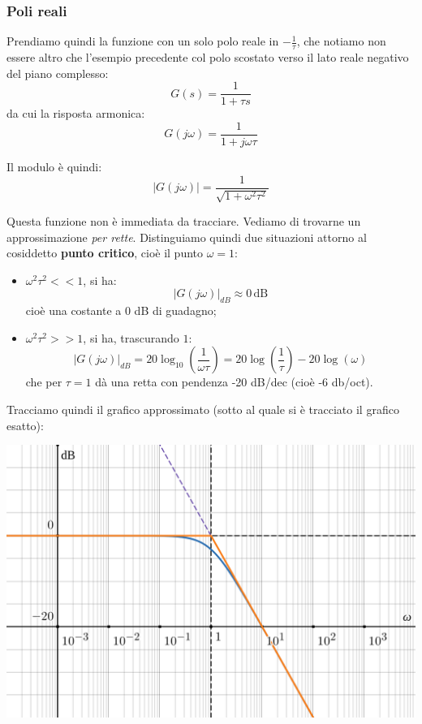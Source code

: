 \documentclass[a4paper,11pt]{article}
\begin{document}
\par\medskip

\subsubsection{Poli reali}
Prendiamo quindi la funzione con un solo polo reale in $-\frac{1}{\tau}$, che notiamo non essere altro che l'esempio precedente col polo scostato verso il lato reale negativo del piano complesso:
$$
G(s) = \frac{1}{1 + \tau s} 
$$
da cui la risposta armonica:
$$
G(j \omega) = \frac{1}{1 + j \omega \tau}
$$

Il modulo è quindi:
$$
|G(j \omega)| = \frac{1}{\sqrt{1 + \omega^2 \tau^2}}
$$

Questa funzione non è immediata da tracciare.
Vediamo di trovarne un approssimazione \textit{per rette}.
Distinguiamo quindi due situazioni attorno al cosiddetto \textbf{punto critico}, cioè il punto $\omega = 1$:
\begin{itemize}
	\item $\omega^2 \tau^2 << 1$, si ha:
		$$
		|G(j\omega)|_{dB} \approx 0 \, \mathrm{dB}
		$$
		cioè una costante a 0 dB di guadagno;
	\item $\omega^2 \tau^2 >> 1$, si ha, trascurando $1$:
		$$
		|G(j \omega)|_{dB} = 20 \log_{10} \left( \frac{1}{\omega \tau} \right) =
		20 \log \left( \frac{1}{\tau} \right) - 20 \log \left( \omega \right)
		$$
		che per $\tau = 1$ dà una retta con pendenza -20 dB/dec (cioè -6 db/oct).
\end{itemize}

\par\medskip

\noindent
\begin{minipage}{\textwidth}
Tracciamo quindi il grafico approssimato (sotto al quale si è tracciato il grafico esatto):
\begin{center}
	\includegraphics[scale=0.3]{../figures/lowpass_bode/mod.png}
\end{center}
\end{minipage}
\end{document}
